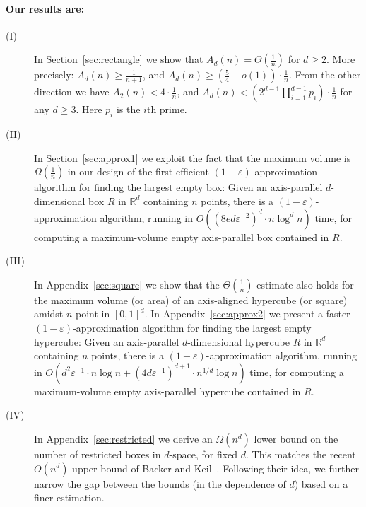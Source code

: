 \documentclass[11pt]{article}
\newcommand{\eps}{\varepsilon}
\newcommand{\RR}{\mathbb{R}}
\begin{document}
\paragraph{Our results are:}\quad
\begin{description}
\item[(I)] In Section~\ref{sec:rectangle} we show 
that $A_d(n)=\Theta\left(\frac{1}{n}\right)$ for $d \geq 2$. More precisely: 
$A_d(n) \geq \frac{1}{n+1}$, and
$A_d(n) \geq \left(\frac{5}{4}-o(1)\right) \cdot \frac{1}{n}$. 
From the other direction we have $A_2(n) < 4\cdot \frac{1}{n}$, and
$A_d(n) < (2^{d-1} \prod_{i=1}^{d-1} p_i) \cdot \frac{1}{n}$ for any
$d \geq 3$. Here $p_i$ is the $i$th prime. 

\item[(II)] In Section~\ref{sec:approx1} we exploit the fact that
the maximum volume is $\Omega\left(\frac{1}{n}\right)$ in our design
of the first efficient 
$(1-\eps)$-approximation algorithm for finding the largest empty box:
Given an axis-parallel $d$-dimensional box $R$ in $\RR^d$ containing
$n$ points, there is a $(1-\eps)$-approximation algorithm, running in  \linebreak
$O((8 e d \eps^{-2})^d \cdot n \log^d{n})$ time, 
for computing a maximum-volume empty axis-parallel box
contained in $R$. 

\item[(III)] In Appendix~\ref{sec:square} we show that the
$\Theta\left(\frac{1}{n}\right)$  estimate also holds for the maximum volume
(or area) of an axis-aligned hypercube (or square) amidst $n$ point in $[0,1]^d$. 
In Appendix~\ref{sec:approx2} we present a faster
$(1-\eps)$-approximation algorithm for finding the largest empty
hypercube: Given an axis-parallel $d$-dimensional hypercube $R$ in $\RR^d$ containing
$n$ points, there is a $(1-\eps)$-approximation algorithm, running in  
$ O( d^2 \eps^{-1} \cdot n \log{n} +
( 4d \eps^{-1})^{d+1} \cdot n^{1/d} \log{n}) $ time, 
for computing a maximum-volume empty axis-parallel hypercube
contained in $R$. 

\item[(IV)] In Appendix~\ref{sec:restricted} we derive
an $\Omega(n^d)$ lower bound on the number of restricted boxes in
$d$-space, for fixed $d$. This matches the recent $O(n^d)$ upper bound
of Backer and Keil~\cite{BK09a,BK09b}. Following their idea, we further
narrow the gap between the bounds (in the dependence of $d$) 
based on a finer estimation. 

\end{description}
\end{document}
